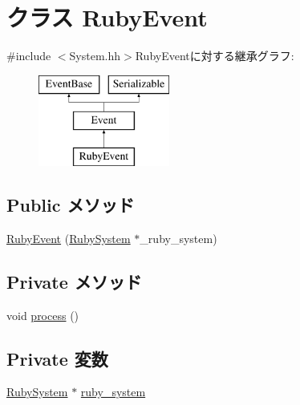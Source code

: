 \hypertarget{classRubySystem_1_1RubyEvent}{
\section{クラス RubyEvent}
\label{classRubySystem_1_1RubyEvent}
}


{\ttfamily \#include $<$System.hh$>$}RubyEventに対する継承グラフ:\begin{figure}[H]
\begin{center}
\leavevmode
\includegraphics[height=3cm]{classRubySystem_1_1RubyEvent}
\end{center}
\end{figure}
\subsection*{Public メソッド}
\begin{DoxyCompactItemize}
\item 
\hyperlink{classRubySystem_1_1RubyEvent_a0d7af27651b7cc286549f123951f6de6}{RubyEvent} (\hyperlink{classRubySystem}{RubySystem} $\ast$\_\-ruby\_\-system)
\end{DoxyCompactItemize}
\subsection*{Private メソッド}
\begin{DoxyCompactItemize}
\item 
void \hyperlink{classRubySystem_1_1RubyEvent_a2e9c5136d19b1a95fc427e0852deab5c}{process} ()
\end{DoxyCompactItemize}
\subsection*{Private 変数}
\begin{DoxyCompactItemize}
\item 
\hyperlink{classRubySystem}{RubySystem} $\ast$ \hyperlink{classRubySystem_1_1RubyEvent_a88928242e9a532cb6f4abe42dd8240a7}{ruby\_\-system}
\end{DoxyCompactItemize}


